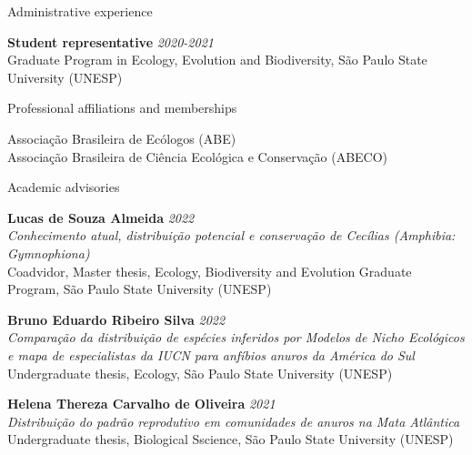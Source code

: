 \documentclass{resume}
\begin{document}

\begin{rSection}{Administrative experience}

{\bf Student representative} \hfill{\em 2020-2021} \\ 
Graduate Program in Ecology, Evolution and Biodiversity, São Paulo State University (UNESP)

\end{rSection}


\begin{rSection}{Professional affiliations and memberships}

Associação Brasileira de Ecólogos (ABE)
\\ Associação Brasileira de Ciência Ecológica e Conservação (ABECO)

\end{rSection}


\begin{rSection}{Academic advisories}

{\bf Lucas de Souza Almeida} \hfill{\em 2022} \\ 
{\it Conhecimento atual, distribuição potencial e conservação de Cecílias (Amphibia: Gymnophiona)} \\
Coadvidor, Master thesis, Ecology, Biodiversity and Evolution Graduate Program, São Paulo State University (UNESP)

{\bf Bruno Eduardo Ribeiro Silva} \hfill{\em 2022} \\ 
{\it Comparação da distribuição de espécies inferidos por Modelos de Nicho Ecológicos e mapa de especialistas da IUCN para anfíbios anuros da América do Sul} \\
Undergraduate thesis, Ecology, São Paulo State University (UNESP)

{\bf Helena Thereza Carvalho de Oliveira} \hfill{\em 2021} \\ 
{\it Distribuição do padrão reprodutivo em comunidades de anuros na Mata Atlântica} \\
Undergraduate thesis, Biological Sscience, São Paulo State University (UNESP)

\end{rSection}
\end{document}
